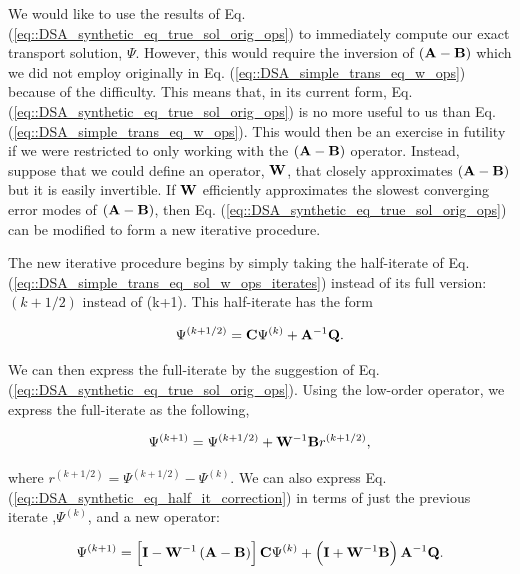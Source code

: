 We would like to use the results of Eq. (\ref{eq::DSA_synthetic_eq_true_sol_orig_ops}) to immediately compute our exact transport solution, $\Psi$. However, this would require the inversion of $\left(  {\bf A} - {\bf B}  \right)$ which we did not employ originally in Eq. (\ref{eq::DSA_simple_trans_eq_w_ops}) because of the difficulty. This means that, in its current form, Eq. (\ref{eq::DSA_synthetic_eq_true_sol_orig_ops}) is no more useful to us than Eq. (\ref{eq::DSA_simple_trans_eq_w_ops}). This would then be an exercise in futility if we were restricted to only working with the $\left(  {\bf A} - {\bf B}  \right)$ operator. Instead, suppose that we could define an operator, ${\bf W}$, that closely approximates $\left(  {\bf A} - {\bf B}  \right)$ but it is easily invertible. If ${\bf W}$ efficiently approximates the slowest converging error modes of $\left(  {\bf A} - {\bf B}  \right)$, then Eq. (\ref{eq::DSA_synthetic_eq_true_sol_orig_ops}) can be modified to form a new iterative procedure.

The new iterative procedure begins by simply taking the half-iterate of Eq. (\ref{eq::DSA_simple_trans_eq_sol_w_ops_iterates}) instead of its full version: ${(k+1/2)}$ instead of {(k+1)}. This half-iterate has the form

\begin{equation}
\label{eq::DSA_synthetic_eq_half_it}
\Psi^{(k+1/2)} = {\bf C} \Psi^{(k)} + {\bf A}^{-1} {\bf Q}.
\end{equation}

\noindent We can then express the full-iterate by the suggestion of Eq. (\ref{eq::DSA_synthetic_eq_true_sol_orig_ops}). Using the low-order operator, we express the full-iterate as the following,

\begin{equation}
\label{eq::DSA_synthetic_eq_half_it_correction}
\Psi^{(k+1)} =\Psi^{(k+1/2)} + {\bf W}^{-1} {\bf B}  r^{(k+1/2)},
\end{equation}

\noindent where $r^{(k+1/2)} = \Psi^{(k+1/2)} - \Psi^{(k)}$. We can also express Eq. (\ref{eq::DSA_synthetic_eq_half_it_correction}) in terms of just the previous iterate ,$\Psi^{(k)}$, and a new operator:

\begin{equation}
\label{eq::DSA_synthetic_eq_new_algo}
\Psi^{(k+1)} = \left[  {\bf I} - {\bf W}^{-1} \left(  {\bf A} - {\bf B}  \right)  \right] {\bf C} \Psi^{(k)} + \left({\bf I} + {\bf W}^{-1} {\bf B} \right) {\bf A}^{-1} {\bf Q} .
\end{equation}

